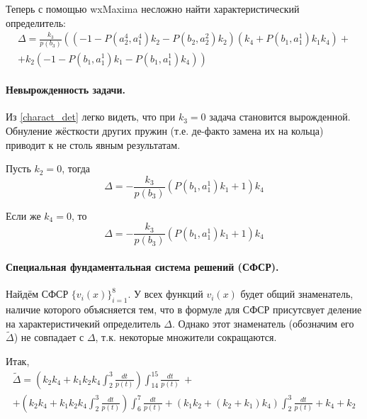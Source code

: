 \documentclass[a4paper,12pt]{article} %
\begin{document}
Теперь с помощью wxMaxima несложно найти характеристический определитель:
\begin{multline}\label{charact_det}
	\Delta =
	\frac{k_3}{p(b_3)}
	\left(
		\left( -1-P\left( a_2^4,a_1^4\right)  k_2-P\left( b_2,a_2^2\right)  k_2\right)
		\left( k_4+P\left( b_1,a_1^1\right)  k_1 k_4\right)
		\right. + \\ + \left.
		k_2 \left( -1-P\left( b_1,a_1^1\right)  k_1-P\left( b_1,a_1^1\right)  k_4\right)
	\right)
\end{multline}

\paragraph{Невырожденность задачи.}
Из \eqref{charact_det} легко видеть,
что при $k_3 = 0$ задача становится вырожденной.
Обнуление жёсткости других пружин (т.е. де-факто замена их на кольца)
приводит к не столь явным результатам.

Пусть $k_2 = 0$, тогда
\begin{equation}
	\Delta = - \frac{k_3}{p(b_3)} \left( P\left( b_1,a_1^1\right)  k_1+1\right)  k_4
\end{equation}

Если же $k_4 = 0$, то
\begin{equation}
	\Delta = - \frac{k_3}{p(b_3)} \left( P\left( b_1,a_1^1\right)  k_1+1\right)  k_4
\end{equation}


\paragraph{Специальная фундаментальная система решений (СФСР).}
Найдём СФСР $\{v_i(x)\}_{i=1}^{8}$.
У всех функций $v_i(x)$ будет общий знаменатель,
наличие которого объясняется тем,
что в формуле для СФСР присутсвует деление на характеристичекий определитель $\Delta$.
Однако этот знаменатель (обозначим его $\tilde{\Delta}$)
не совпадает с $\Delta$,
т.к. некоторые множители сокращаются.


Итак,
\begin{multline}
	\tilde{\Delta} =
	\left( k_2 k_4+k_1 k_2 k_4 \int_{2}^{3}\frac{dt}{p(t)}\right)  \int_{14}^{15}\frac{dt}{p(t)} \ +
	\\+
	\left( k_2 k_4+k_1 k_2 k_4 \int_{2}^{3}\frac{dt}{p(t)}\right)  \int_{6}^{7}\frac{dt}{p(t)}+
	\left( k_1 k_2+\left( k_2+k_1\right)  k_4\right)  \int_{2}^{3}\frac{dt}{p(t)}+k_4+k_2
\end{multline}
\end{document}
